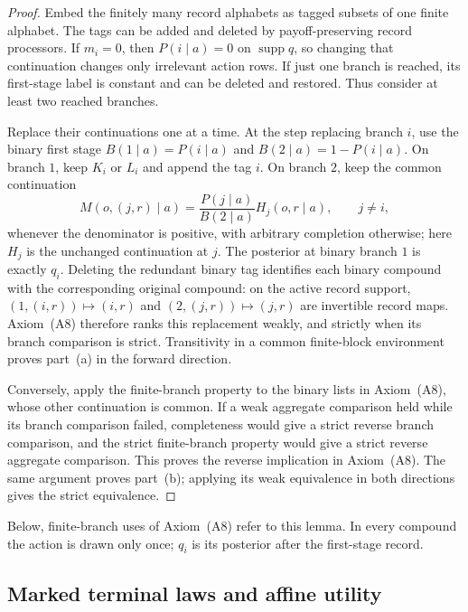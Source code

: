 \documentclass[11pt,a4paper]{article}
\theoremstyle{definition}
\newcommand{\supp}{\operatorname{supp}}
\newcommand{\1}{\mathbf 1}
\begin{document}
\begin{proof}
Embed the finitely many record alphabets as tagged subsets of one finite
alphabet.  The tags can be added and deleted by payoff-preserving record
processors.  If $m_i=0$, then $P(i\mid a)=0$ on $\supp q$, so changing that
continuation changes only irrelevant action rows.  If just one branch is
reached, its first-stage label is constant and can be deleted and restored.
Thus consider at least two reached branches.

Replace their continuations one at a time.  At the step replacing branch
$i$, use the binary first stage
$B(1\mid a)=P(i\mid a)$ and $B(2\mid a)=1-P(i\mid a)$.
On branch $1$, keep $K_i$ or $L_i$ and append the tag $i$.
On branch $2$, keep the common continuation
\begin{equation}
M(o,(j,r)\mid a)
=\frac{P(j\mid a)}{B(2\mid a)}H_j(o,r\mid a),\qquad j\ne i,
\label{pt:eq:complement-continuation}
\end{equation}
whenever the denominator is positive, with arbitrary completion otherwise;
here $H_j$ is the unchanged continuation at $j$.  The posterior at binary
branch $1$ is exactly $q_i$.  Deleting the redundant binary tag identifies
each binary compound with the corresponding original compound: on the active
record support, $(1,(i,r))\mapsto(i,r)$ and
$(2,(j,r))\mapsto(j,r)$ are invertible record maps.
Axiom~\textup{(A8)} therefore ranks this replacement weakly, and strictly
when its branch comparison is strict.  Transitivity in a common finite-block
environment proves part~\textup{(a)} in the forward direction.

Conversely, apply the finite-branch property to the binary lists in
Axiom~\textup{(A8)}, whose other continuation is common.  If a weak aggregate
comparison held while its branch comparison failed, completeness would give
a strict reverse branch comparison, and the strict finite-branch property
would give a strict reverse aggregate comparison.  This proves the reverse
implication in Axiom~\textup{(A8)}.  The same argument proves
part~\textup{(b)}; applying its weak equivalence in both directions gives
the strict equivalence.
\end{proof}

Below, finite-branch uses of Axiom~\textup{(A8)} refer to this lemma.
In every compound the action is drawn only once; $q_i$ is its posterior
after the first-stage record.

\subsection{Marked terminal laws and affine utility}
\end{document}
